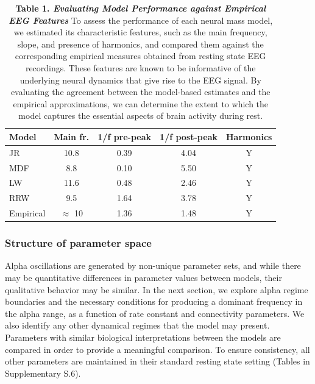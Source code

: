 \documentclass[12pt,twoside]{article}
\begin{document}
\begin{table}[h]  
\centering %
\begin{tabular}{l c c c c} %
\hline\hline   
Model & Main fr. & 1/f pre-peak & 1/f post-peak & Harmonics 
\\ 
\hline   
 JR & 10.8 & 0.39 & 4.04 & Y \\
 MDF & 8.8 & 0.10 & 5.50 & Y \\
LW & 11.6 & 0.48 & 2.46 & Y \\
RRW & 9.5 & 1.64 & 3.78 & Y \\
\hline\hline %
Empirical & $\approx$ 10 & 1.36 & 1.48 & Y\\
\hline
\end{tabular}  
 \caption*{\textbf{Table 1. \textit{Evaluating Model Performance against Empirical EEG Features}}  To assess the performance of each neural mass model, we estimated its characteristic features, such as the main frequency, slope, and presence of harmonics, and compared them against the corresponding empirical measures obtained from resting state EEG recordings. These features are known to be informative of the underlying neural dynamics that give rise to the EEG signal. By evaluating the agreement between the model-based estimates and the empirical approximations, we can determine the extent to which the model captures the essential aspects of brain activity during rest.}  
\end{table}  

\subsubsection{Structure of parameter space}
Alpha oscillations are generated by non-unique parameter sets, and while there may be quantitative differences in parameter values between models, their qualitative behavior may be similar. In the next section, we explore alpha regime boundaries and the necessary conditions for producing a dominant frequency in the alpha range, as a function of rate constant and connectivity parameters. We also identify any other dynamical regimes that the model may present. Parameters with similar biological interpretations between the models are compared in order to provide a meaningful comparison.  
To ensure consistency, all other parameters are maintained in their standard resting state setting (Tables in Supplementary S.6).
\end{document}

